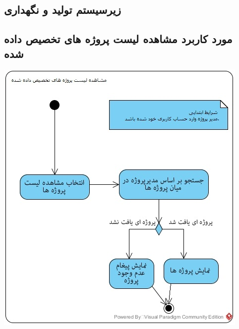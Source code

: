 \documentclass{article}
\begin{document}
\newpage
\subsection{زیرسیستم تولید و نگهداری}

\vspace{2cm}
\subsection*{مورد کاربرد مشاهده لیست پروژه های تخصیص داده شده}
\vspace{2cm}
\begin{center}
\includegraphics[width=\textwidth]{ActivityDiagrams/16.jpg}
\end{center}


\newpage
\vspace{2cm}
\end{document}
